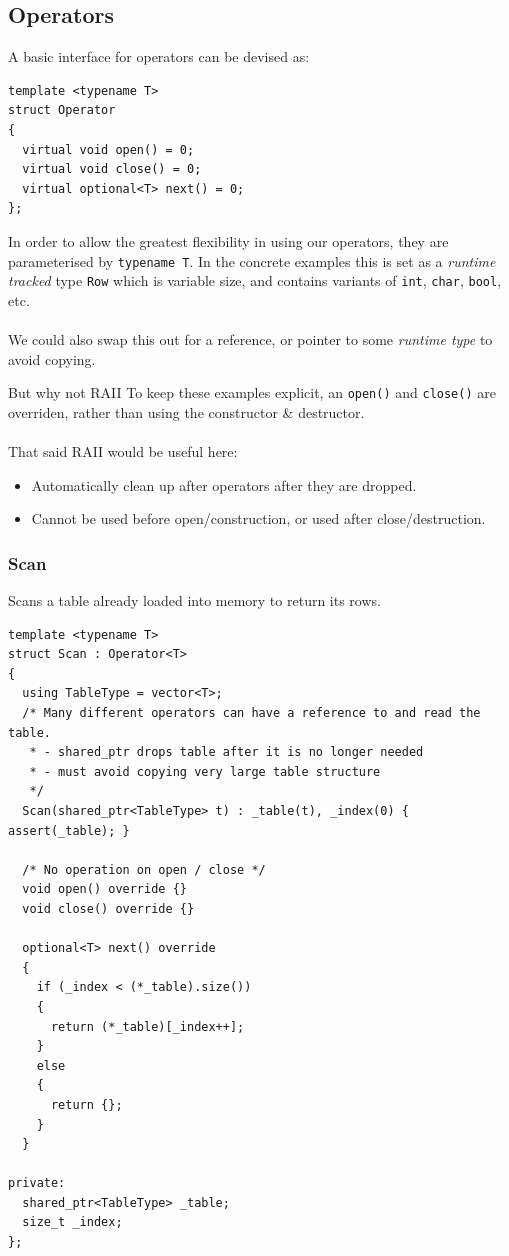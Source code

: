 \subsection{Operators}
A basic interface for operators can be devised as:
\begin{verbatim}
template <typename T>
struct Operator
{
  virtual void open() = 0;
  virtual void close() = 0;
  virtual optional<T> next() = 0;
};
\end{verbatim}
In order to allow the greatest flexibility in using our operators, they are parameterised by \texttt{typename T}. 
In the concrete examples this is set as a \textit{runtime tracked} type \texttt{Row} which is variable size, and contains variants of \texttt{int}, \texttt{char}, \texttt{bool}, etc.
\\
\\ We could also swap this out for a reference, or pointer to some \textit{runtime type} to avoid copying.

\begin{sidenotebox}{But why not RAII}
    To keep these examples explicit, an \texttt{open()} and \texttt{close()} are overriden, rather than using the constructor \& destructor.
    \\
    \\ That said RAII would be useful here:
    \begin{itemize}
        \item Automatically clean up after operators after they are dropped.
        \item Cannot be used before open/construction, or used after close/destruction.
    \end{itemize}
\end{sidenotebox}

\subsubsection{Scan}
Scans a table already loaded into memory to return its rows.
\begin{verbatim}
template <typename T>
struct Scan : Operator<T>
{
  using TableType = vector<T>;
  /* Many different operators can have a reference to and read the table.
   * - shared_ptr drops table after it is no longer needed
   * - must avoid copying very large table structure
   */
  Scan(shared_ptr<TableType> t) : _table(t), _index(0) { assert(_table); }

  /* No operation on open / close */
  void open() override {}
  void close() override {}

  optional<T> next() override
  {
    if (_index < (*_table).size())
    {
      return (*_table)[_index++];
    }
    else
    {
      return {};
    }
  }

private:
  shared_ptr<TableType> _table;
  size_t _index;
};
\end{verbatim}

